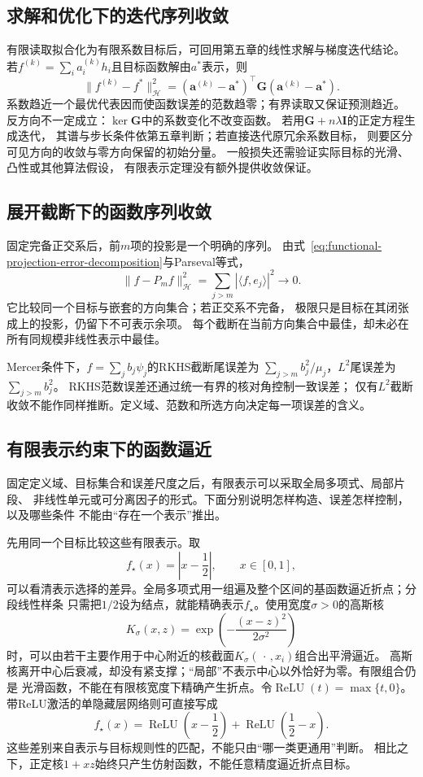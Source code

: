 \subsection{求解和优化下的迭代序列收敛}
\label{sec:functional-iteration-convergence}

有限读取拟合化为有限系数目标后，可回用第五章的线性求解与梯度迭代结论。
若$f^{(k)}=\sum_i a_i^{(k)}h_i$且目标函数解由$a^*$表示，则
\[
 \lVert f^{(k)}-f^*\rVert_{\mathcal H}^2
 =(\bm a^{(k)}-\bm a^*)^\top\bm G(\bm a^{(k)}-\bm a^*).
\]
系数趋近一个最优代表因而使函数误差的范数趋零；有界读取又保证预测趋近。
反方向不一定成立：$\ker\bm G$中的系数变化不改变函数。
若用$\bm G+n\lambda\bm I$的正定方程生成迭代，
其谱与步长条件依第五章判断；若直接迭代原冗余系数目标，
则要区分可见方向的收敛与零方向保留的初始分量。
一般损失还需验证实际目标的光滑、凸性或其他算法假设，
有限表示定理没有额外提供收敛保证。

\subsection{展开截断下的函数序列收敛}
\label{sec:functional-truncation-convergence}

固定完备正交系后，前$m$项的投影是一个明确的序列。
由式~\eqref{eq:functional-projection-error-decomposition}与Parseval等式，
\[
 \lVert f-P_mf\rVert_{\mathcal H}^2
 =\sum_{j>m}|\langle f,e_j\rangle|^2\to0.
\]
它比较同一个目标与嵌套的方向集合；若正交系不完备，
极限只是目标在其闭张成上的投影，仍留下不可表示余项。
每个截断在当前方向集合中最佳，却未必在所有同规模非线性表示中最佳。

Mercer条件下，$f=\sum_j b_j\psi_j$的RKHS截断尾误差为
$\sum_{j>m}b_j^2/\mu_j$，$L^2$尾误差为$\sum_{j>m}b_j^2$。
RKHS范数误差还通过统一有界的核对角控制一致误差；
仅有$L^2$截断收敛不能作同样推断。定义域、范数和所选方向决定每一项误差的含义。

\subsection{有限表示约束下的函数逼近}
\label{sec:functional-approximation-capacity-representation}

固定定义域、目标集合和误差尺度之后，有限表示可以采取全局多项式、局部片段、
非线性单元或可分离因子的形式。下面分别说明怎样构造、误差怎样控制，以及哪些条件
不能由“存在一个表示”推出。

先用同一个目标比较这些有限表示。取
\[
  f_\star(x)=\left|x-\frac12\right|,
  \qquad x\in[0,1],
\]
可以看清表示选择的差异。全局多项式用一组遍及整个区间的基函数逼近折点；分段线性样条
只需把$1/2$设为结点，就能精确表示$f_\star$。使用宽度$\sigma>0$的高斯核
\[
  K_\sigma(x,z)
  =
  \exp\left(-\frac{(x-z)^2}{2\sigma^2}\right)
\]
时，可以由若干主要作用于中心附近的核截面$K_\sigma(\,\cdot\,,x_i)$组合出平滑逼近。
高斯核离开中心后衰减，却没有紧支撑；“局部”不表示中心以外恰好为零。有限组合仍是
光滑函数，不能在有限核宽度下精确产生折点。令$\operatorname{ReLU}(t)=\max\{t,0\}$。带ReLU激活的单隐藏层网络则可直接写成
\[
  f_\star(x)
  =
  \operatorname{ReLU}\left(x-\frac12\right)
  +
  \operatorname{ReLU}\left(\frac12-x\right).
\]
这些差别来自表示与目标规则性的匹配，不能只由“哪一类更通用”判断。
相比之下，正定核$1+xz$始终只产生仿射函数，不能任意精度逼近折点目标。

